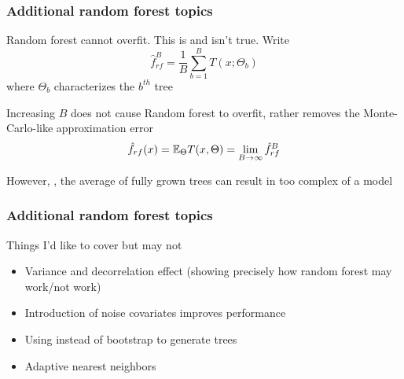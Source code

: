 \documentclass[12pt]{beamer}
\begin{document}
\begin{frame}
\frametitle{Additional random forest topics}
 Random forest cannot overfit.
\vsp
This is and isn't true.  Write
\[
\hat{f}_{rf}^B = \frac{1}{B} \sum_{b=1}^B T(x;\Theta_b)
\]
where $\Theta_b$ characterizes the $b^{th}$ tree

\vsp

Increasing $B$ does not cause Random forest to overfit, rather removes the
Monte-Carlo-like approximation error
\[
\hat{f}_{rf}(x) = \mathbb{E}_\Theta T(x,\Theta) = \lim_{B\rightarrow\infty}\hat{f}_{rf}^B
\]

\vsp

However, , the average of fully grown trees can result
in too complex of a model

\end{frame}


\begin{frame}
\frametitle{Additional random forest topics}
Things I'd like to cover but may not 


\begin{itemize}
\item Variance and decorrelation effect (showing precisely how random forest may work/not work)
\item Introduction of noise covariates improves performance
\item Using  instead of bootstrap to generate trees

\item Adaptive nearest neighbors
\end{itemize}
\end{frame}
\end{document}
